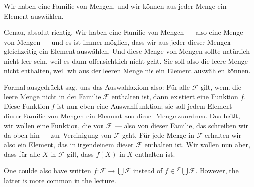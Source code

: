\begin{student-interaction}[Studentenantwort]
Wir haben eine Familie von Mengen, und wir können aus jeder Menge ein Element auswählen.
\end{student-interaction}

\begin{spoken-clean}[00:01:05 - 00:02:40]
Genau, absolut richtig. Wir haben eine Familie von Mengen --- also eine Menge von Mengen --- und es ist immer möglich, dass wir aus jeder dieser Mengen gleichzeitig ein Element auswählen. Und diese Menge von Mengen sollte natürlich nicht leer sein, weil es dann offensichtlich nicht geht. Sie soll also die leere Menge nicht enthalten, weil wir aus der leeren Menge nie ein Element auswählen können.

Formal ausgedrückt sagt uns das Auswahlaxiom also: Für alle $\mathcal{F}$ gilt, wenn die leere Menge nicht in der Familie $\mathcal{F}$ enthalten ist, dann existiert eine Funktion $f$. Diese Funktion $f$ ist nun eben eine Auswahlfunktion; sie soll jedem Element dieser Familie von Mengen ein Element aus dieser Menge zuordnen. Das heißt, wir wollen eine Funktion, die von $\mathcal{F}$ --- also von dieser Familie, das schreiben wir da oben hin --- zur Vereinigung von $\mathcal{F}$ geht. Für jede Menge in $\mathcal{F}$ erhalten wir also ein Element, das in irgendeinem dieser $\mathcal{F}$ enthalten ist. Wir wollen nun aber, dass für alle $X$ in $\mathcal{F}$ gilt, dass $f(X)$ in $X$ enthalten ist.
\end{spoken-clean}

\begin{math-stroke}
\end{math-stroke}
\begin{didactic-insight}
One coulde also have written $f: \mathcal{F} \to \bigcup \mathcal{F}$ instead of $f \in {}^{ \mathcal{F}}\!\bigcup \mathcal{F}$. However, the latter is more common in the lecture.
\end{didactic-insight}



